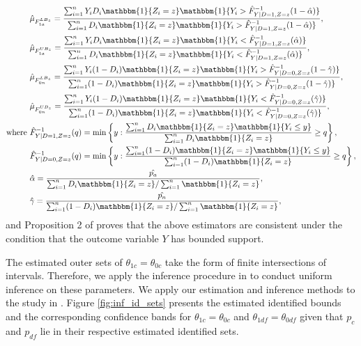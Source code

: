 \documentclass[12pt]{article}
\theoremstyle{plain}
\theoremstyle{definition}
\theoremstyle{remark}
\begin{document}
\begin{equation*}
    \begin{aligned}
        & \hat{\mu}_{F_{1a}^{LB_z}} = \frac{\sum_{i = 1}^{n} Y_i D_i \mathbbm{1} \{Z_i = z\} \mathbbm{1} \{Y_i > \hat{F}^{-1}_{Y \mid D = 1, Z = z}(1 - \hat{\alpha})\}}{\sum_{i = 1}^{n} D_i \mathbbm{1} \{Z_i = z\} \mathbbm{1} \{Y_i > \hat{F}^{-1}_{Y \mid D = 1, Z = z}(1 - \hat{\alpha})\}}, \\
        & \hat{\mu}_{F_{1a}^{UB_z}} = \frac{\sum_{i = 1}^{n} Y_i D_i \mathbbm{1} \{Z_i = z\} \mathbbm{1} \{Y_i < \hat{F}^{-1}_{Y \mid D = 1, Z = z}(\hat{\alpha})\}}{\sum_{i = 1}^{n} D_i \mathbbm{1} \{Z_i = z\} \mathbbm{1} \{Y_i < \hat{F}^{-1}_{Y \mid D = 1, Z = z}(\hat{\alpha})\}}, \\
        &\hat{\mu}_{F_{0n}^{LB_z}} = \frac{\sum_{i = 1}^{n} Y_i (1-D_i) \mathbbm{1} \{Z_i = z\} \mathbbm{1} \{Y_i > \hat{F}^{-1}_{Y \mid D = 0, Z = z}(1 - \hat{\gamma})\}}{\sum_{i = 1}^{n} (1-D_i) \mathbbm{1} \{Z_i = z\} \mathbbm{1} \{Y_i > \hat{F}^{-1}_{Y \mid D = 0, Z = z}(1 - \hat{\gamma})\}}, \\
        & \hat{\mu}_{F_{0n}^{UB_z}} = \frac{\sum_{i = 1}^{n} Y_i (1-D_i) \mathbbm{1} \{Z_i = z\} \mathbbm{1} \{Y_i < \hat{F}^{-1}_{Y \mid D = 0, Z = z}(\hat{\gamma})\}}{\sum_{i = 1}^{n} (1-D_i )\mathbbm{1} \{Z_i = z\} \mathbbm{1} \{Y_i < \hat{F}^{-1}_{Y \mid D = 0, Z = z}(\hat{\gamma})\}}, \\
        \text{where }& \hat{F}^{-1}_{Y \mid D = 1, Z = z}(q) = \min \left\{y: \frac{\sum_{i = 1}^{n}D_i \mathbbm{1} \{Z_i = z\} \mathbbm{1}\{Y_i \leq y\}}{\sum_{i = 1}^{n} D_i \mathbbm{1} \{Z_i = z\}} \geq q\right\}, \\
        & \hat{F}^{-1}_{Y \mid D = 0, Z = z}(q) = \min \left\{y: \frac{\sum_{i = 1}^{n}(1-D_i) \mathbbm{1} \{Z_i = z\} \mathbbm{1}\{Y_i \leq y\}}{\sum_{i = 1}^{n} (1-D_i) \mathbbm{1} \{Z_i = z\}} \geq q\right\}, \\
        & \hat{\alpha} = \frac{\hat{p_a}}{\sum_{i=1}^{n} D_i \mathbbm{1} \{Z_i = z\} / \sum_{i=1}^{n} \mathbbm{1} \{Z_i = z\}}, \\
        & \hat{\gamma} = \frac{\hat{p_n}}{\sum_{i=1}^{n} (1-D_i) \mathbbm{1} \{Z_i = z\} / \sum_{i=1}^{n} \mathbbm{1} \{Z_i = z\}},
    \end{aligned}
\end{equation*}
and Proposition 2 of \cite{Lee2009TrainingEffects} proves that the above estimators are consistent under the condition that the outcome variable $Y$ has bounded support.

The estimated outer sets of $\theta_{1c} = \theta_{0c}$ take the form of finite intersections of intervals. Therefore, we apply the inference procedure in \cite{Nevo2012IdentificationInstruments} to conduct uniform inference on these parameters. We apply our estimation and inference methods to the study in \cite{bursztyn2020misperceived}. Figure \ref{fig:inf_id_sets} presents the estimated identified bounds and the corresponding confidence bands for $\theta_{1c} = \theta_{0c}$ and $\theta_{1 df} = \theta_{0 df}$ given that $p_c$ and $p_{df}$ lie in their respective estimated identified sets.
\end{document}
